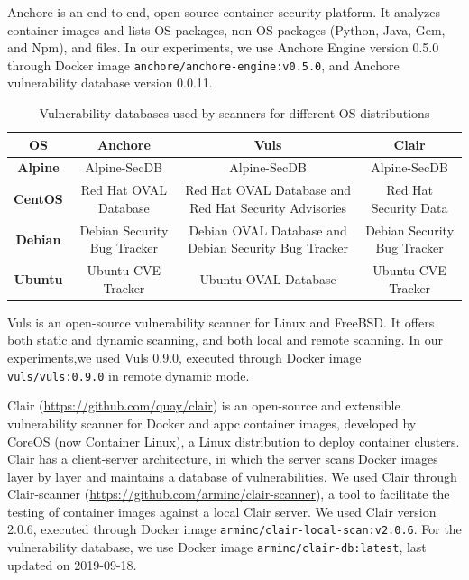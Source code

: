 \documentclass[a4paper,num-refs]{oup-contemporary}
\begin{document}
Anchore is an end-to-end, open-source container security platform. It
analyzes container images and lists OS
packages, non-OS packages (Python, Java, Gem, and Npm), and files.
In our experiments, we use Anchore Engine version 0.5.0 through Docker image \texttt{anchore/anchore-engine:v0.5.0}, and
Anchore vulnerability database version 0.0.11.

\begin{table}
\begin{tabular}{|c|c|c|c|}
 \hline
\textbf{OS} &	\textbf{Anchore} &	\textbf{Vuls} &	\textbf{Clair} \\
\hline
	\textbf{Alpine} & Alpine-SecDB &	Alpine-SecDB &	Alpine-SecDB \\
\hline
	\textbf{CentOS} & Red Hat OVAL Database & Red Hat OVAL Database and Red Hat Security Advisories & Red Hat Security Data \\
\hline
	\textbf{Debian} & Debian Security Bug Tracker &	Debian OVAL Database and Debian Security Bug Tracker & Debian Security Bug Tracker \\
\hline
	\textbf{Ubuntu} & Ubuntu CVE Tracker &	Ubuntu OVAL Database &	Ubuntu CVE Tracker \\
 \hline
\end{tabular}
\caption{Vulnerability databases used by scanners for different OS distributions}
\label{database}
\end{table}

Vuls is an open-source vulnerability scanner for Linux and FreeBSD. It
offers both static and dynamic scanning, and both local and remote
scanning. In our experiments,we used Vuls 0.9.0, executed through Docker image
\texttt{vuls/vuls:0.9.0} in remote dynamic mode.

Clair (\url{https://github.com/quay/clair}) is an open-source and extensible
vulnerability scanner for Docker and appc container images, developed by
CoreOS (now Container Linux), a Linux distribution to deploy container
clusters. Clair has a client-server architecture, in which the server
scans Docker images layer by layer and maintains a database of vulnerabilities. We used Clair through Clair-scanner
(\url{https://github.com/arminc/clair-scanner}), a tool to facilitate the testing
of container images against a local Clair server. 
We used Clair version 2.0.6, executed through
Docker image \texttt{arminc/clair-local-scan:v2.0.6}. For the vulnerability
database, we use Docker image \texttt{arminc/clair-db:latest}, last
updated on 2019-09-18.
\end{document}
